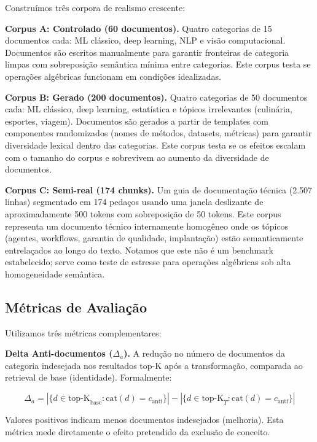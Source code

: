 \documentclass{article}
\begin{document}
Construímos três corpora de realismo crescente:

\textbf{Corpus A: Controlado (60 documentos).} Quatro categorias de 15 documentos cada: ML clássico, deep learning, NLP e visão computacional. Documentos são escritos manualmente para garantir fronteiras de categoria limpas com sobreposição semântica mínima entre categorias. Este corpus testa se operações algébricas funcionam em condições idealizadas.

\textbf{Corpus B: Gerado (200 documentos).} Quatro categorias de 50 documentos cada: ML clássico, deep learning, estatística e tópicos irrelevantes (culinária, esportes, viagem). Documentos são gerados a partir de templates com componentes randomizados (nomes de métodos, datasets, métricas) para garantir diversidade lexical dentro das categorias. Este corpus testa se os efeitos escalam com o tamanho do corpus e sobrevivem ao aumento da diversidade de documentos.

\textbf{Corpus C: Semi-real (174 chunks).} Um guia de documentação técnica (2.507 linhas) segmentado em 174 pedaços usando uma janela deslizante de aproximadamente 500 tokens com sobreposição de 50 tokens. Este corpus representa um documento técnico internamente homogêneo onde os tópicos (agentes, workflows, garantia de qualidade, implantação) estão semanticamente entrelaçados ao longo do texto. Notamos que este não é um benchmark estabelecido; serve como teste de estresse para operações algébricas sob alta homogeneidade semântica.

\subsection{Métricas de Avaliação}

Utilizamos três métricas complementares:

\textbf{Delta Anti-documentos ($\Delta_a$).} A redução no número de documentos da categoria indesejada nos resultados top-K após a transformação, comparada ao retrieval de base (identidade). Formalmente:

\begin{equation}
\Delta_a = |\{d \in \text{top-K}_{\text{base}} : \text{cat}(d) = c_{\text{anti}}\}| - |\{d \in \text{top-K}_{T} : \text{cat}(d) = c_{\text{anti}}\}|
\end{equation}

Valores positivos indicam menos documentos indesejados (melhoria). Esta métrica mede diretamente o efeito pretendido da exclusão de conceito.
\end{document}
